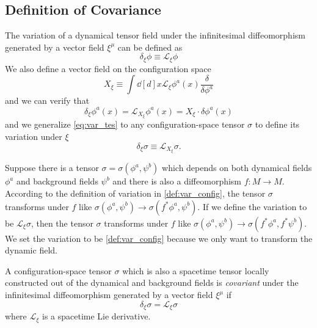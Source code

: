 \documentclass[10pt]{article}
\begin{document}
\subsection{Definition of Covariance}
The variation of a dynamical tensor field under the infinitesimal diffeomorphism generated by a vector field $\xi^\mu$ can be defined as
\begin{equation}
    \delta_{\xi}\phi\equiv\mathcal{L}_\xi \phi
\end{equation}
We also define a vector field on the configuration space
\begin{equation}
    X_\xi\equiv\int\dd[d]{x}\mathcal{L}_\xi \phi^a(x)\frac{\delta}{\delta \phi^a}
\end{equation}
and we can verify that
\begin{equation}\label{eq:var_tes}
    \delta_\xi \phi^a(x)=\mathcal{L}_{X_\xi}\phi^a(x)=X_{\xi}\cdot\delta\phi^a(x)
\end{equation}
and we generalize \cref{eq:var_tes} to any configuration-space tensor $\sigma$ to define its variation under $\xi$
\begin{equation}
    \delta_\xi\sigma\equiv\mathcal{L}_{X_\xi}\sigma.\label{def:var_config}
\end{equation}
\begin{remark}
    Suppose there is a tensor $\sigma=\sigma(\phi^a,\psi^b)$ which depends on both dynamical fields $\phi^a$ and background fields $\psi^b$ and there is also a diffeomorphism $f:M\to M$.
    According to the definition of variation in \cref{def:var_config}, the tensor $\sigma$ transforms under $f$ like $\sigma(\phi^a,\psi^b)\to\sigma(f^\ast\phi^a,\psi^b)$.
    If we define the variation to be $\mathcal{L}_\xi \sigma$, then the tensor $\sigma$ transforms under $f$ like $\sigma(\phi^a,\psi^b)\to\sigma(f^\ast\phi^a,f^\ast\psi^b)$.
    We set the variation to be \cref{def:var_config} because we only want to transform the dynamic field.
\end{remark}

\begin{definition}[Covariance]
    A configuration-space tensor $\sigma$ which is also a spacetime tensor locally constructed out of the dynamical and background fields is \textit{covariant} under the infinitesimal diffeomorphism generated by a vector field $\xi^\mu$ if
    \begin{equation}
        \delta_{\xi}\sigma=\mathcal{L}_\xi \sigma\label{eq:cov_def}
    \end{equation}
    where $\mathcal{L}_\xi$ is a spacetime Lie derivative.
\end{definition}
\end{document}

